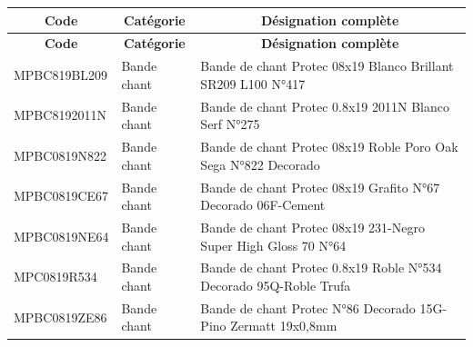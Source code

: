 \documentclass[12pt,a4paper]{article}
\begin{document}
\begin{longtable}{|p{3cm}|p{3cm}|p{8cm}|}
\hline
\multicolumn{1}{|c|}{\textbf{Code}} & \multicolumn{1}{c|}{\textbf{Catégorie}} & \multicolumn{1}{c|}{\textbf{Désignation complète}} \\
\hline
\endfirsthead
\hline
\multicolumn{1}{|c|}{\textbf{Code}} & \multicolumn{1}{c|}{\textbf{Catégorie}} & \multicolumn{1}{c|}{\textbf{Désignation complète}} \\
\hline
\endhead
\hline
\endfoot
MPBC819BL209 & Bande chant & Bande de chant Protec 08x19 Blanco Brillant SR209 L100 N°417 \\
MPBC8192011N & Bande chant & Bande de chant Protec 0.8x19 2011N Blanco Serf N°275 \\
MPBC0819N822 & Bande chant & Bande de chant Protec 08x19 Roble Poro Oak Sega N°822 Decorado \\
MPBC0819CE67 & Bande chant & Bande de chant Protec 08x19 Grafito N°67 Decorado 06F-Cement \\
MPBC0819NE64 & Bande chant & Bande de chant Protec 08x19 231-Negro Super High Gloss 70 N°64 \\
MPC0819R534 & Bande chant & Bande de chant Protec 0.8x19 Roble N°534 Decorado 95Q-Roble Trufa \\
MPBC0819ZE86 & Bande chant & Bande de chant Protec N°86 Decorado 15G-Pino Zermatt 19x0,8mm \\
\hline
\end{longtable}
\end{document}
